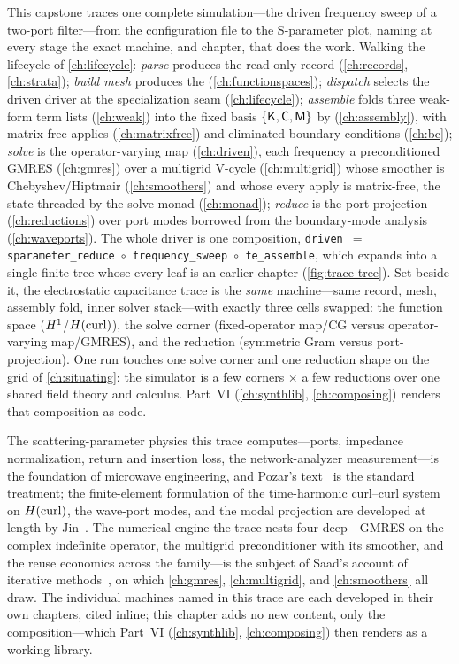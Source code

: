 \summarysection
This capstone traces one complete simulation---the driven frequency sweep of a
two-port filter---from the configuration file to the S-parameter plot, naming at
every stage the exact machine, and chapter, that does the work. Walking the
lifecycle of \cref{ch:lifecycle}: \emph{parse} produces the read-only 
record (\cref{ch:records}, \cref{ch:strata}); \emph{build mesh} produces the
 (\cref{ch:functionspaces}); \emph{dispatch} selects the driven driver at
the specialization seam (\cref{ch:lifecycle}); \emph{assemble} folds three weak-form
term lists (\cref{ch:weak}) into the fixed basis $\{\mathsf{K},\mathsf{C},\mathsf{M}\}$ by
 (\cref{ch:assembly}), with matrix-free applies
(\cref{ch:matrixfree}) and eliminated boundary conditions (\cref{ch:bc});
\emph{solve} is the operator-varying map  (\cref{ch:driven}),
each frequency a preconditioned GMRES (\cref{ch:gmres}) over a multigrid V-cycle
(\cref{ch:multigrid}) whose smoother is Chebyshev/Hiptmair (\cref{ch:smoothers}) and
whose every apply is matrix-free, the state threaded by the solve monad
(\cref{ch:monad}); \emph{reduce} is the port-projection 
(\cref{ch:reductions}) over port modes borrowed from the boundary-mode analysis
(\cref{ch:waveports}). The whole driver is one composition, \texttt{driven $=$
sparameter\_reduce $\circ$ frequency\_sweep $\circ$ fe\_assemble}, which expands into
a single finite tree whose every leaf is an earlier chapter (\cref{fig:trace-tree}).
Set beside it, the electrostatic capacitance trace is the \emph{same} machine---same
record, mesh, assembly fold, inner solver stack---with exactly three cells swapped:
the function space ($H^1$/$H(\mathrm{curl})$), the solve corner (fixed-operator map/CG versus
operator-varying map/GMRES), and the reduction (symmetric Gram versus
port-projection). One run touches one solve corner and one reduction shape on the
grid of \cref{ch:situating}: the simulator is a few corners $\times$ a few reductions
over one shared field theory and calculus. Part~VI (\cref{ch:synthlib},
\cref{ch:composing}) renders that composition as code.

\furtherreading
The scattering-parameter physics this trace computes---ports, impedance
normalization, return and insertion loss, the network-analyzer measurement---is the
foundation of microwave engineering, and Pozar's text~\citep{pozar2011} is the
standard treatment; the finite-element formulation of the time-harmonic curl--curl
system on $H(\mathrm{curl})$, the wave-port modes, and the modal projection are developed at
length by Jin~\citep{jin2014}. The numerical engine the trace nests four
deep---GMRES on the complex indefinite operator, the multigrid preconditioner with
its smoother, and the reuse economics across the family---is the subject of Saad's
account of iterative methods~\citep{saad2003}, on which \cref{ch:gmres},
\cref{ch:multigrid}, and \cref{ch:smoothers} all draw. The individual machines named
in this trace are each developed in their own chapters, cited inline; this chapter
adds no new content, only the composition---which Part~VI (\cref{ch:synthlib},
\cref{ch:composing}) then renders as a working library.

